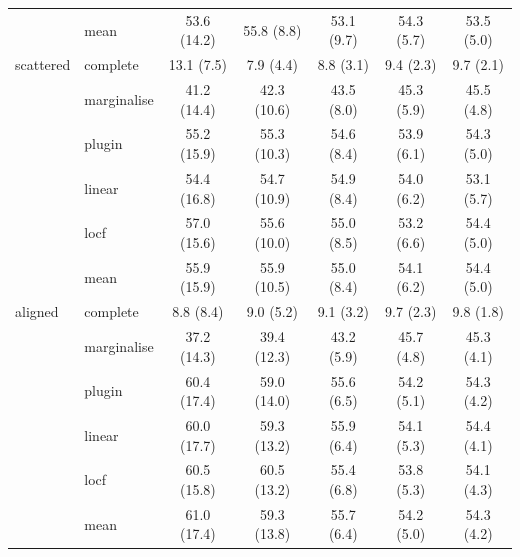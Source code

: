 \begin{table}[htbp]
\begin{tabular}{llccccc}
     & mean & 53.6 (14.2) & 55.8 (8.8) & 53.1 (9.7) & 54.3 (5.7) & 53.5 (5.0) \\
    \addlinespace
    scattered & complete & 13.1 (7.5) & 7.9 (4.4) & 8.8 (3.1) & 9.4 (2.3) & 9.7 (2.1) \\
     & marginalise & 41.2 (14.4) & 42.3 (10.6) & 43.5 (8.0) & 45.3 (5.9) & 45.5 (4.8) \\
     & plugin & 55.2 (15.9) & 55.3 (10.3) & 54.6 (8.4) & 53.9 (6.1) & 54.3 (5.0) \\
     & linear & 54.4 (16.8) & 54.7 (10.9) & 54.9 (8.4) & 54.0 (6.2) & 53.1 (5.7) \\
     & locf & 57.0 (15.6) & 55.6 (10.0) & 55.0 (8.5) & 53.2 (6.6) & 54.4 (5.0) \\
     & mean & 55.9 (15.9) & 55.9 (10.5) & 55.0 (8.4) & 54.1 (6.2) & 54.4 (5.0) \\
    \addlinespace
    aligned & complete & 8.8 (8.4) & 9.0 (5.2) & 9.1 (3.2) & 9.7 (2.3) & 9.8 (1.8) \\
     & marginalise & 37.2 (14.3) & 39.4 (12.3) & 43.2 (5.9) & 45.7 (4.8) & 45.3 (4.1) \\
     & plugin & 60.4 (17.4) & 59.0 (14.0) & 55.6 (6.5) & 54.2 (5.1) & 54.3 (4.2) \\
     & linear & 60.0 (17.7) & 59.3 (13.2) & 55.9 (6.4) & 54.1 (5.3) & 54.4 (4.1) \\
     & locf & 60.5 (15.8) & 60.5 (13.2) & 55.4 (6.8) & 53.8 (5.3) & 54.1 (4.3) \\
     & mean & 61.0 (17.4) & 59.3 (13.8) & 55.7 (6.4) & 54.2 (5.0) & 54.3 (4.2) \\
    \bottomrule
  \end{tabular}
\end{table}
